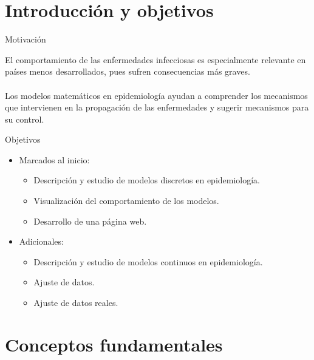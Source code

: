 \section{Introducción y objetivos}


\begin{frame}[c]{Motivación}

    El comportamiento de las enfermedades infecciosas es especialmente relevante en países menos desarrollados, pues sufren consecuencias más graves.
    \\~\\
    Los modelos matemáticos en epidemiología ayudan a comprender los mecanismos que intervienen en la propagación de las enfermedades y sugerir mecanismos para su control.

\end{frame}


\begin{frame}{Objetivos}

    \begin{itemize}
        \item Marcados al inicio:

        \pause
        \begin{itemize}
            \item Descripción y estudio de modelos discretos en epidemiología.
            \pause
            \item Visualización del comportamiento de los modelos.
            \pause
            \item Desarrollo de una página web.
        \end{itemize}
        
        \pause
        \item Adicionales:

        \pause
        \begin{itemize}
            \item Descripción y estudio de modelos continuos en epidemiología.
            \pause
            \item Ajuste de datos.
            \pause
            \item Ajuste de datos reales.
        \end{itemize}
    \end{itemize}

\end{frame}




\section{Conceptos fundamentales}


